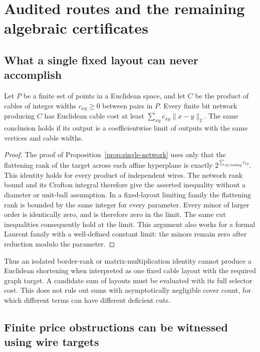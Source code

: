 \section{Audited routes and the remaining algebraic certificates}
\label{sec:root-routes}

\subsection{What a single fixed layout can never accomplish}

\begin{proposition}
\label{rt:crofton}
Let $P$ be a finite set of points in a Euclidean space, and let $C$ be the
product of cables of integer widths $c_{xy}\geq0$ between pairs in $P$.
Every finite bit network producing $C$ has Euclidean cable cost at least
$\sum_{xy}c_{xy}\|x-y\|_2$. The same conclusion holds if its output is a
coefficientwise limit of outputs with the same vertices and cable widths.
\end{proposition}
\begin{proof}
The proof of Proposition~\ref{prop:single-network} uses only that the
flattening rank of the target across each affine hyperplane is exactly
$2^{\sum_{xy\text{ crossing}}c_{xy}}$. This identity holds for every
product of independent wires. The network rank bound and its Crofton
integral therefore give the asserted inequality without a diameter or
unit-ball assumption. In a fixed-layout limiting family the flattening
rank is bounded by the same integer for every parameter. Every minor of
larger order is identically zero, and is therefore zero in the limit.
The same cut inequalities consequently hold at the limit. This argument
also works for a formal Laurent family with a well-defined constant limit:
the minors remain zero after reduction modulo the parameter.
\end{proof}

Thus an isolated border-rank or matrix-multiplication identity cannot
produce a Euclidean shortening when interpreted as one fixed cable
layout with the required graph target. A candidate sum of layouts must
be evaluated with its full selector cost. This does not rule out sums
with asymptotically negligible cover count, for which different terms
can have different deficient cuts.

\subsection{Finite price obstructions can be witnessed using wire targets}

